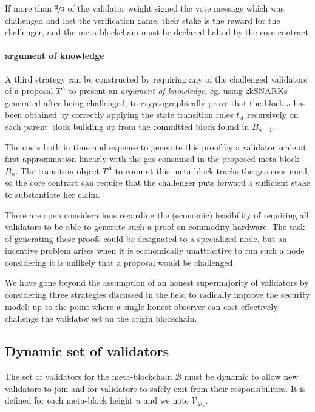 \documentclass[12pt,a4paper]{article}
\begin{document}
If more than $\sfrac{2}{3}$ of the validator weight signed the vote message which was challenged and lost the verification game, their stake is the reward for the challenger, and the meta-blockchain must be declared halted by the core contract.

\paragraph{argument of knowledge} A third strategy can be constructed by requiring any of the challenged validators of a proposal $T^A$ to present an \emph{argument of knowledge}, eg. using \mbox{zkSNARKs} generated after being challenged, to cryptographically prove that the block $s$ has been obtained by correctly applying the state transition rules $t_A$ recursively on each parent block building up from the committed block found in $B_{n-1}$.

The costs both in time and expense to generate this proof by a validator scale at first approximation linearly with the gas consumed in the proposed meta-block $B_n$.
The transition object $T^A$ to commit this meta-block tracks the gas consumed, so the core contract can require that the challenger puts forward a sufficient stake to substantiate her claim.

There are open considerations regarding the (economic) feasibility of requiring all validators to be able to generate such a proof on commodity hardware.
The task of generating these proofs could be designated to a specialized node, but an incentive problem arises when it is economically unattractive to run such a node considering it is unlikely that a proposal would be challenged.

We have gone beyond the assumption of an honest supermajority of validators by considering three strategies discussed in the field to radically improve the security model; up to the point where a single honest observer can cost-effectively challenge the validator set on the origin blockchain.


\subsection{Dynamic set of validators}

The set of validators for the meta-blockchain $\mathcal{B}$ must be dynamic to allow new validators to join and for validators to safely exit from their responsibilities.
It is defined for each meta-block height $n$ and we note $\mathcal{V}_{\mathcal{B}_n}$.
\end{document}

